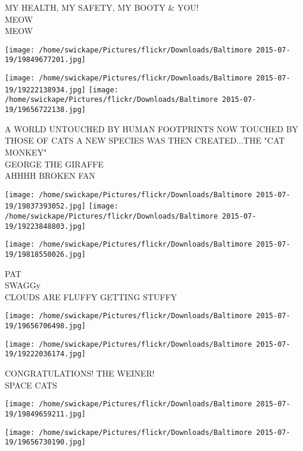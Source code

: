 \documentclass[10pt,letterpaper]{article}
\begin{document}
MY HEALTH, MY SAFETY, MY BOOTY \& YOU!\\
MEOW\\
MEOW\\
\pagebreak

\texttt{[image: /home/swickape/Pictures/flickr/Downloads/Baltimore 2015-07-19/19849677201.jpg]}

\vspace{0.25in}
\texttt{[image: /home/swickape/Pictures/flickr/Downloads/Baltimore 2015-07-19/19222138934.jpg]}
\texttt{[image: /home/swickape/Pictures/flickr/Downloads/Baltimore 2015-07-19/19656722138.jpg]}

A WORLD UNTOUCHED BY HUMAN FOOTPRINTS NOW TOUCHED BY THOSE OF CATS A NEW SPECIES WAS THEN CREATED...THE "CAT MONKEY"\\
GEORGE THE GIRAFFE\\
AHHHH BROKEN FAN\\
\pagebreak

\texttt{[image: /home/swickape/Pictures/flickr/Downloads/Baltimore 2015-07-19/19837393052.jpg]}
\texttt{[image: /home/swickape/Pictures/flickr/Downloads/Baltimore 2015-07-19/19223848803.jpg]}

\vspace{0.25in}
\texttt{[image: /home/swickape/Pictures/flickr/Downloads/Baltimore 2015-07-19/19818550026.jpg]}

PAT\\
SWAGGy\\
CLOUDS ARE FLUFFY GETTING STUFFY\\
\pagebreak

\texttt{[image: /home/swickape/Pictures/flickr/Downloads/Baltimore 2015-07-19/19656706498.jpg]}

\vspace{0.25in}
\texttt{[image: /home/swickape/Pictures/flickr/Downloads/Baltimore 2015-07-19/19222036174.jpg]}

CONGRATULATIONS!  THE WEINER!\\
SPACE CATS\\
\pagebreak

\texttt{[image: /home/swickape/Pictures/flickr/Downloads/Baltimore 2015-07-19/19849659211.jpg]}

\vspace{0.25in}
\texttt{[image: /home/swickape/Pictures/flickr/Downloads/Baltimore 2015-07-19/19656730190.jpg]}
\end{document}

